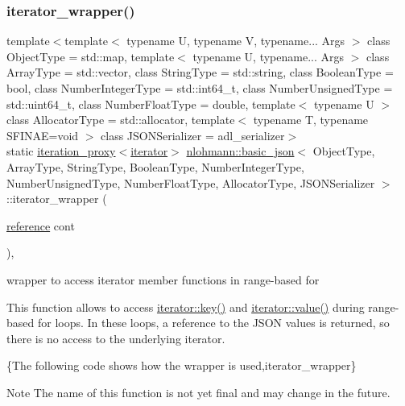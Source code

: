 \subsubsection{\texorpdfstring{iterator\+\_\+wrapper()}{iterator\_wrapper()}\hspace{0.1cm}{\footnotesize\ttfamily [1/2]}}
{\footnotesize\ttfamily template$<$template$<$ typename U, typename V, typename... Args $>$ class Object\+Type = std\+::map, template$<$ typename U, typename... Args $>$ class Array\+Type = std\+::vector, class String\+Type  = std\+::string, class Boolean\+Type  = bool, class Number\+Integer\+Type  = std\+::int64\+\_\+t, class Number\+Unsigned\+Type  = std\+::uint64\+\_\+t, class Number\+Float\+Type  = double, template$<$ typename U $>$ class Allocator\+Type = std\+::allocator, template$<$ typename T, typename S\+F\+I\+N\+A\+E=void $>$ class J\+S\+O\+N\+Serializer = adl\+\_\+serializer$>$ \\
static \mbox{\hyperlink{classnlohmann_1_1detail_1_1iteration__proxy}{iteration\+\_\+proxy}}$<$\mbox{\hyperlink{classnlohmann_1_1basic__json_a099316232c76c034030a38faa6e34dca}{iterator}}$>$ \mbox{\hyperlink{classnlohmann_1_1basic__json}{nlohmann\+::basic\+\_\+json}}$<$ Object\+Type, Array\+Type, String\+Type, Boolean\+Type, Number\+Integer\+Type, Number\+Unsigned\+Type, Number\+Float\+Type, Allocator\+Type, J\+S\+O\+N\+Serializer $>$\+::iterator\+\_\+wrapper (\begin{DoxyParamCaption}\item[{\mbox{\hyperlink{classnlohmann_1_1basic__json_ac6a5eddd156c776ac75ff54cfe54a5bc}{reference}}}]{cont }\end{DoxyParamCaption})\hspace{0.3cm}{\ttfamily [inline]}, {\ttfamily [static]}}



wrapper to access iterator member functions in range-\/based for 

This function allows to access \mbox{\hyperlink{classnlohmann_1_1detail_1_1iter__impl_a3a541a223320f6635f2f188ba54f8818}{iterator\+::key()}} and \mbox{\hyperlink{classnlohmann_1_1detail_1_1iter__impl_ab447c50354c6611fa2ae0100ac17845c}{iterator\+::value()}} during range-\/based for loops. In these loops, a reference to the J\+S\+ON values is returned, so there is no access to the underlying iterator.

\{The following code shows how the wrapper is used,iterator\+\_\+wrapper\}

\begin{DoxyNote}{Note}
The name of this function is not yet final and may change in the future. 
\end{DoxyNote}
\mbox{\label{classnlohmann_1_1basic__json_adb4db7abbc5ba12c9273f032a7b89198}} 
